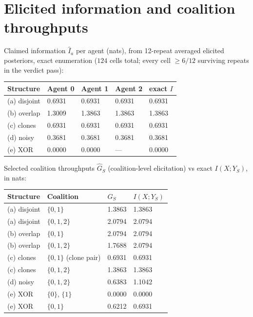 \documentclass{article} %
\newcommand{\Ihat}{\hat{I}}
\newcommand{\Ghat}{\hat{G}}
\begin{document}
\section{Elicited information and coalition throughputs}
\label{app:elicitation}

Claimed information $\Ihat_a$ per agent (nats), from 12-repeat averaged elicited posteriors, exact enumeration ($124$ cells total; every cell $\geq 6/12$ surviving repeats in the verdict pass):

\begin{center}
\small
\begin{tabular}{@{}lllll@{}}
\toprule
Structure & Agent 0 & Agent 1 & Agent 2 & exact $I$ \\
\midrule
(a) disjoint & 0.6931 & 0.6931 & 0.6931 & 0.6931 \\
(b) overlap & 1.3009 & 1.3863 & 1.3863 & 1.3863 \\
(c) clones & 0.6931 & 0.6931 & 0.6931 & 0.6931 \\
(d) noisy & 0.3681 & 0.3681 & 0.3681 & 0.3681 \\
(e) XOR & 0.0000 & 0.0000 & --- & 0.0000 \\
\bottomrule
\end{tabular}
\end{center}

Selected coalition throughputs $\Ghat_S$ (coalition-level elicitation) vs exact $I(X; Y_S)$, in nats:

\begin{center}
\small
\begin{tabular}{@{}llll@{}}
\toprule
Structure & Coalition & $\Ghat_S$ & $I(X;Y_S)$ \\
\midrule
(a) disjoint & $\{0,1\}$ & 1.3863 & 1.3863 \\
(a) disjoint & $\{0,1,2\}$ & 2.0794 & 2.0794 \\
(b) overlap & $\{0,1\}$ & 2.0794 & 2.0794 \\
(b) overlap & $\{0,1,2\}$ & 1.7688 & 2.0794 \\
(c) clones & $\{0,1\}$ (clone pair) & 0.6931 & 0.6931 \\
(c) clones & $\{0,1,2\}$ & 1.3863 & 1.3863 \\
(d) noisy & $\{0,1,2\}$ & 0.6383 & 1.1042 \\
(e) XOR & $\{0\}$, $\{1\}$ & 0.0000 & 0.0000 \\
(e) XOR & $\{0,1\}$ & 0.6212 & 0.6931 \\
\bottomrule
\end{tabular}
\end{center}
\end{document}
